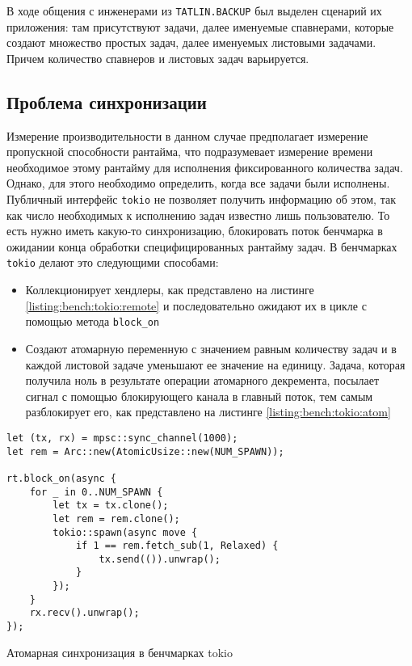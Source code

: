 В ходе общения с инженерами из \verb|TATLIN.BACKUP| был выделен сценарий их приложения: там присутствуют задачи, далее именуемые спавнерами, которые создают множество простых задач, далее именуемых листовыми задачами. Причем количество спавнеров и листовых задач варьируется.

\subsection{Проблема синхронизации}

Измерение производительности в данном случае предполагает измерение пропускной способности рантайма, что подразумевает измерение времени необходимое этому рантайму для исполнения фиксированного количества задач. Однако, для этого необходимо определить, когда все задачи были исполнены. Публичный интерфейс \verb|tokio| не позволяет получить информацию об этом, так как число необходимых к исполнению задач известно лишь пользователю. То есть нужно иметь какую-то синхронизацию, блокировать поток бенчмарка в ожидании конца обработки специфицированных рантайму задач. В бенчмарках \verb|tokio| делают это следующими способами:

\begin{itemize}
    \item Коллекционирует хендлеры, как представлено на листинге \ref{listing:bench:tokio:remote} и последовательно ожидают их в цикле с помощью метода \verb|block_on|
    \item Создают атомарную переменную с значением равным количеству задач и в каждой листовой задаче уменьшают ее значение на единицу. Задача, которая получила ноль в результате операции атомарного декремента, посылает сигнал с помощью блокирующего канала в главный поток, тем самым разблокирует его, как представлено на листинге \ref{listing:bench:tokio:atom}
\end{itemize}

\begin{listing}[H]
    \begin{verbatim}
let (tx, rx) = mpsc::sync_channel(1000);
let rem = Arc::new(AtomicUsize::new(NUM_SPAWN));

rt.block_on(async {
    for _ in 0..NUM_SPAWN {
        let tx = tx.clone();
        let rem = rem.clone();
        tokio::spawn(async move {
            if 1 == rem.fetch_sub(1, Relaxed) {
                tx.send(()).unwrap();
            }
        });
    }
    rx.recv().unwrap();
});
    \end{verbatim}

    \caption{Атомарная синхронизация в бенчмарках tokio}
    \label{listing:bench:tokio:atom}
\end{listing}

